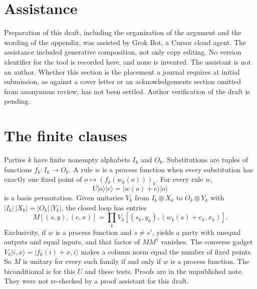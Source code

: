 \documentclass[12pt]{article}
\begin{document}
\section{Assistance}
\label{sec:assist}

Preparation of this draft, including the organization of the argument and the wording of the appendix, was assisted by Grok Bot, a Cursor cloud agent. The assistance included generative composition, not only copy editing. No version identifier for the tool is recorded here, and none is invented. The assistant is not an author. Whether this section is the placement a journal requires at initial submission, as against a cover letter or an acknowledgements section omitted from anonymous review, has not been settled. Author verification of the draft is pending.

\appendix
\section{The finite clauses}
\label{app}

Parties \(k\) have finite nonempty alphabets \(I_k\) and \(O_k\). Substitutions are tuples of functions \(f_k\colon I_k\to O_k\). A rule \(w\) is a process function when every substitution has exactly one fixed point of \(o\mapsto(f_k(w_k(o)))_k\). For every rule \(w\),
\[
U\lvert o\rangle\lvert e\rangle=\lvert w(o)+e\rangle\lvert o\rangle
\]
is a basis permutation. Given unitaries \(V_k\) from \(I_k\otimes X_k\) to \(O_k\otimes Y_k\) with \(|I_k|\,|X_k|=|O_k|\,|Y_k|\), the closed loop has entries
\[
M[(s,y),(e,x)]=\prod_k V_k[(s_k,y_k),(w_k(s)+e_k,x_k)].
\]
Exclusivity, if \(w\) is a process function and \(s\neq s'\), yields a party with unequal outputs and equal inputs, and that factor of \(MM^{\dagger}\) vanishes. The converse gadget \(V_k\lvert i,x\rangle=\lvert f_k(i)+x,i\rangle\) makes a column norm equal the number of fixed points. So \(M\) is unitary for every such family if and only if \(w\) is a process function. The biconditional is for this \(U\) and these tests. Proofs are in the unpublished note. They were not re-checked by a proof assistant for this draft.
\end{document}
